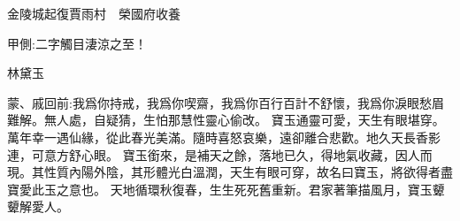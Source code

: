 
\begin{parag}
    金陵城起復賈雨村　榮國府收養\begin{note}甲側:二字觸目淒涼之至！\end{note}林黛玉
\end{parag}

\begin{parag}
    \begin{note}蒙、戚回前:我爲你持戒，我爲你喫齋，我爲你百行百計不舒懷，我爲你淚眼愁眉難解。無人處，自疑猜，生怕那慧性靈心偷改。
        寶玉通靈可愛，天生有眼堪穿。萬年幸一遇仙緣，從此春光美滿。隨時喜怒哀樂，遠卻離合悲歡。地久天長香影連，可意方舒心眼。
        寶玉銜來，是補天之餘，落地已久，得地氣收藏，因人而現。其性質內陽外陰，其形體光白溫潤，天生有眼可穿，故名曰寶玉，將欲得者盡寶愛此玉之意也。
        天地循環秋復春，生生死死舊重新。君家著筆描風月，寶玉顰顰解愛人。\end{note}
\end{parag}



